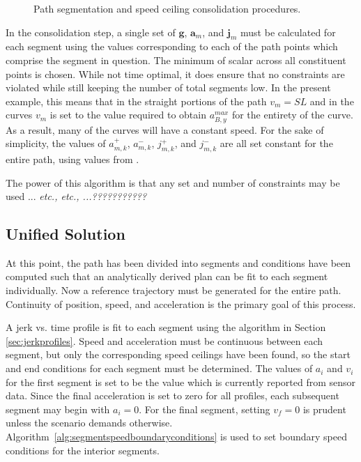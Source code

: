 \documentclass[letterpaper, 10 pt, conference]{ieeeconf}  %
\begin{document}
\begin{figure}[thpb]
{  }
  \caption{Path segmentation and speed ceiling consolidation procedures.}
  \label{fig:1Dto2DandSegmentation}
\end{figure}

In the consolidation step, a single set of $\mathbf{g}$, $\mathbf{a}_m$, and $\mathbf{j}_m$ must be calculated for each segment using the values corresponding to each of the path points which comprise the segment in question.
The minimum of scalar across all constituent points is chosen.
While not time optimal, it does ensure that no constraints are violated while still keeping the number of total segments low.
In the present example, this means that in the straight portions of the path $v_m = SL$ and in the curves $v_m$ is set to the value required to obtain $a_{B,y}^{max}$ for the entirety of the curve.
As a result, many of the curves will have a constant speed.
For the sake of simplicity, the values of $a^+_{m,k}$, $a^-_{m,k}$, $j^+_{m,k}$, and $j^-_{m,k}$ are all set constant for the entire path, using values from \cite{Maurya2012,Hoberock1977,Long2000}.


The power of this algorithm is that any set and number of constraints may be used ... \emph{etc., etc., ...???????????}\tabularnewline


\subsection{Unified Solution} \label{sec:unifiedsolution}

At this point, the path has been divided into segments and conditions have been computed such that an analytically derived plan can be fit to each segment individually.
Now a reference trajectory must be generated for the entire path.
Continuity of position, speed, and acceleration is the primary goal of this process.

A jerk vs. time profile is fit to each segment using the algorithm in Section \ref{sec:jerkprofiles}.
Speed and acceleration must be continuous between each segment, but only the corresponding speed ceilings have been found, so the start and end conditions for each segment must be determined.
The values of $a_i$ and $v_i$ for the first segment is set to be the value which is currently reported from sensor data.
Since the final acceleration is set to zero for all profiles, each subsequent segment may begin with $a_i = 0$.
For the final segment, setting $v_f = 0$ is prudent unless the scenario demands otherwise.
Algorithm~\ref{alg:segmentspeedboundaryconditions} is used to set boundary speed conditions for the interior segments. 
\end{document}
